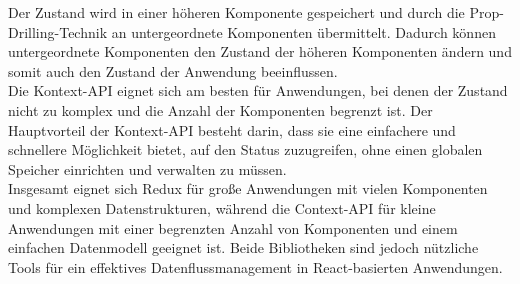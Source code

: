 Der Zustand wird in einer höheren Komponente gespeichert und durch die Prop-Drilling-Technik an untergeordnete Komponenten übermittelt. Dadurch können untergeordnete Komponenten den Zustand der höheren Komponenten ändern und somit auch den Zustand der Anwendung beeinflussen.\\
Die Kontext-API eignet sich am besten für Anwendungen, bei denen der Zustand nicht zu komplex und die Anzahl der Komponenten begrenzt ist. Der Hauptvorteil der Kontext-API besteht darin, dass sie eine einfachere und schnellere Möglichkeit bietet, auf den Status zuzugreifen, ohne einen globalen Speicher einrichten und verwalten zu müssen.\\\cite{scalablepath}
Insgesamt eignet sich Redux  für große Anwendungen mit vielen Komponenten und  komplexen Datenstrukturen, während die Context-API für kleine Anwendungen mit einer begrenzten Anzahl von Komponenten und einem einfachen Datenmodell geeignet ist. Beide Bibliotheken sind jedoch nützliche Tools für ein effektives Datenflussmanagement in React-basierten Anwendungen.\cite{scalablepath}
